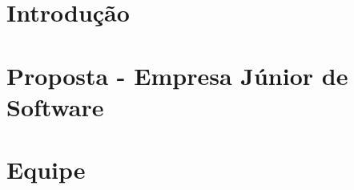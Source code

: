 \section{Introdução} %
\label{sec:introdu_o}
 

\section{Proposta - Empresa Júnior de Software} %
\label{sec:proposta}
 

\section{Equipe} %
\label{sec:equipe}


%

%
